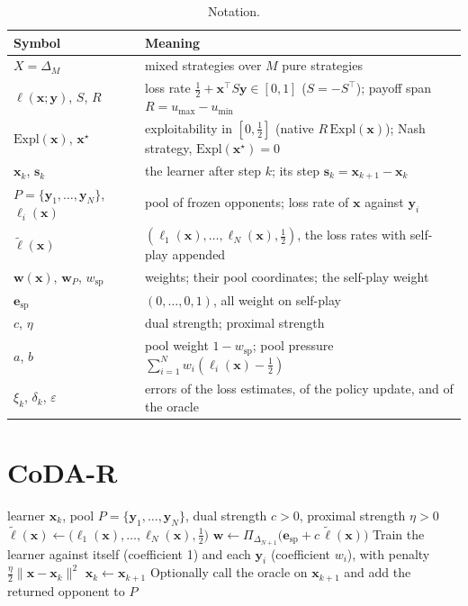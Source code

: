 \documentclass{article}
\theoremstyle{plain}
\theoremstyle{remark}
\newcommand{\Expl}{\mathrm{Expl}}
\newcommand{\Proj}{\Pi}
\newcommand{\simplex}{\Delta}
\newcommand{\bx}{{\bm{x}}}
\newcommand{\by}{{\bm{y}}}
\newcommand{\bw}{{\bm{w}}}
\newcommand{\be}{{\bm{e}}}
\newcommand{\bell}{{\bm{\ell}}}
\newcommand{\aug}{\tilde{\bell}}
\newcommand{\xs}{\bx^{\star}}
\newcommand{\dx}{{\bm{s}}}
\newcommand{\esp}{\be_{\mathrm{sp}}}
\newcommand{\wsp}{w_{\mathrm{sp}}}
\newcommand{\codar}{CoDA-R}
\begin{document}
\begin{table}[t]
\caption{Notation.}
\label{tab:notation}
\begin{center}
\small
\begin{tabular}{ll}
\toprule
Symbol & Meaning \\
\midrule
$X=\simplex_M$ & mixed strategies over $M$ pure strategies \\
$\ell(\bx;\by)$, $S$, $R$ & loss rate $\tfrac12+\bx^\top S\by\in[0,1]$ ($S=-S^\top$); payoff span $R=u_{\max}-u_{\min}$ \\
$\Expl(\bx)$, $\xs$ & exploitability in $[0,\tfrac12]$ (native $R\,\Expl(\bx)$); Nash strategy, $\Expl(\xs)=0$ \\
$\bx_k$, $\dx_k$ & the learner after step $k$; its step $\dx_k=\bx_{k+1}-\bx_k$ \\
$P=\{\by_1,\dots,\by_N\}$, $\ell_i(\bx)$ & pool of frozen opponents; loss rate of $\bx$ against $\by_i$ \\
$\aug(\bx)$ & $(\ell_1(\bx),\dots,\ell_N(\bx),\tfrac12)$, the loss rates with self-play appended \\
$\bw(\bx)$, $\bw_P$, $\wsp$ & weights; their pool coordinates; the self-play weight \\
$\esp$ & $(0,\dots,0,1)$, all weight on self-play \\
$c$, $\eta$ & dual strength; proximal strength \\
$a$, $b$ & pool weight $1-\wsp$; pool pressure $\sum_{i=1}^N w_i(\ell_i(\bx)-\tfrac12)$ \\
$\xi_k$, $\delta_k$, $\varepsilon$ & errors of the loss estimates, of the policy update, and of the oracle \\
\bottomrule
\end{tabular}
\end{center}
\end{table}

\section{\codar{}}
\label{sec:alg}

\begin{algorithm}[t]
\caption{One step of exact \codar{}.}
\label{alg:codar}
\begin{algorithmic}[1]
\Require learner $\bx_k$, pool $P=\{\by_1,\dots,\by_N\}$, dual strength $c>0$, proximal strength $\eta>0$
\State $\aug(\bx)\leftarrow\big(\ell_1(\bx),\dots,\ell_N(\bx),\tfrac12\big)$ 
\State $\bw\leftarrow\Proj_{\simplex_{N+1}}\big(\esp+c\,\aug(\bx)\big)$ 
\State Train the learner against itself (coefficient 1) and each $\by_i$ (coefficient $w_i$), with penalty $\tfrac\eta2\|\bx-\bx_k\|^2$ 
\State $\bx_k\leftarrow\bx_{k+1}$ 
\State Optionally call the oracle on $\bx_{k+1}$ and add the returned opponent to $P$
\end{algorithmic}
\end{algorithm}
\end{document}
